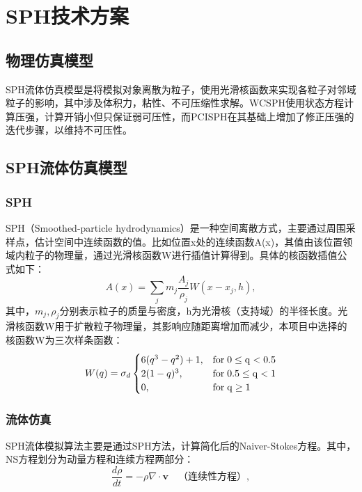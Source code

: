 \section{SPH技术方案}

\subsection{物理仿真模型}
SPH流体仿真模型是将模拟对象离散为粒子，使用光滑核函数来实现各粒子对邻域粒子的影响，其中涉及体积力，粘性、不可压缩性求解。WCSPH使用状态方程计算压强，计算开销小但只保证弱可压性，而PCISPH在其基础上增加了修正压强的迭代步骤，以维持不可压性。

\subsection{SPH流体仿真模型}
\subsubsection{SPH}
SPH（Smoothed-particle hydrodynamics）是一种空间离散方式，主要通过周围采样点，估计空间中连续函数的值。比如位置x处的连续函数A(x)，其值由该位置领域内粒子的物理量，通过光滑核函数W进行插值计算得到。具体的核函数插值公式如下：
\begin{equation}
	A(x)=\sum_{j}m_j\frac{A_j}{\rho_j}W(x-x_j,h),
\end{equation}
其中，$m_j,\rho_j$分别表示粒子的质量与密度，h为光滑核（支持域）的半径长度。光滑核函数W用于扩散粒子物理量，其影响应随距离增加而减少，本项目中选择的核函数W为三次样条函数：
\begin{equation}
	W(q)=\sigma_d \begin{cases}
		6(q^3-q^2)+1, & \rm{for\; 0\leq q< 0.5} \\
		2(1-q)^3,     & \rm{for\; 0.5\leq q< 1} \\
		0,            & \rm{for\; q\ge 1}       \\
	\end{cases}
\end{equation}

\subsubsection{流体仿真}
SPH流体模拟算法主要是通过SPH方法，计算简化后的Naiver-Stokes方程。其中，NS方程划分为动量方程和连续方程两部分：
\begin{equation}
	\frac{d\rho}{dt}=-\rho\nabla·\boldsymbol{v}\quad\text{（连续性方程）},
\end{equation}

